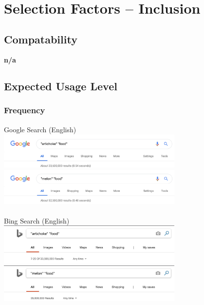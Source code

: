 \documentclass[11pt, oneside,a4paper]{article}
\begin{document}
  \newpage


  \section{Selection Factors -- Inclusion}
    \subsection{Compatability}
    \textbf{n/a}

    \subsection{Expected Usage Level}
      \subsubsection{Frequency}
        \paragraph{}
        Google Search (English) \\
        \includegraphics[width=350px]{google_english/artichoke.png}\\
        \includegraphics[width=350px]{google_english/melon.png}

        \vspace{1.5 cm}

        \paragraph{}
        \noindent Bing Search (English) \\
        \includegraphics[width=350px]{bing_english/artichoke.png}\\
        \includegraphics[width=350px]{bing_english/melon.png}
\end{document}
